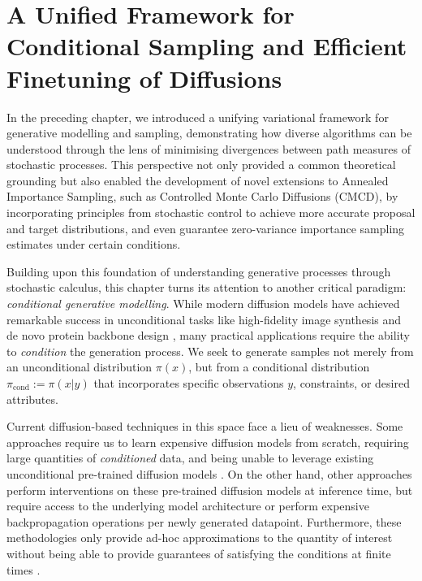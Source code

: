 \chapter[Unified Framework for Conditional Sampling and Finetuning of Diffusions]{A Unified Framework for Conditional Sampling and Efficient Finetuning of Diffusions}
\label{chapter:deft}
\ifpdf
    \graphicspath{{Chapter4/Figs/Raster/}{Chapter4/Figs/PDF/}{Chapter4/Figs/}}
\else
    \graphicspath{{Chapter4/Figs/Vector/}{Chapter4/Figs/}}
\fi

In the preceding chapter, we introduced a unifying variational framework for generative modelling and sampling, demonstrating how diverse algorithms can be understood through the lens of minimising divergences between path measures of stochastic processes. This perspective not only provided a common theoretical grounding but also enabled the development of novel extensions to Annealed Importance Sampling, such as Controlled Monte Carlo Diffusions (CMCD), by incorporating principles from stochastic control to achieve more accurate proposal and target distributions, and even guarantee zero-variance importance sampling estimates under certain conditions.

Building upon this foundation of understanding generative processes through stochastic calculus, this chapter turns its attention to another critical paradigm: \emph{conditional generative modelling}. While modern diffusion models have achieved remarkable success in unconditional tasks like high-fidelity image synthesis \citep{ho2020denoising} and de novo protein backbone design \citep{watson2023novo}, many practical applications require the ability to \emph{condition} the generation process. We seek to generate samples not merely from an unconditional distribution $\pi(x)$, but from a conditional distribution $\pi_{\text{cond}} :=\pi(x|y)$ that incorporates specific observations $y$, constraints, or desired attributes. 

Current diffusion-based techniques in this space face a lieu of weaknesses. Some approaches require us to learn expensive diffusion models from scratch, requiring large quantities of \textit{conditioned} data, and being unable to leverage existing unconditional pre-trained diffusion models \cite{ho2022classifier}. On the other hand, other approaches perform interventions on these pre-trained diffusion models at inference time, but require access to the underlying model architecture or perform expensive backpropagation operations per newly generated datapoint. Furthermore, these methodologies only provide ad-hoc approximations to the quantity of interest without being able to provide guarantees of satisfying the conditions at finite times \textcite{chung2022diffusion,finzi2023user,jalal2021robust,rout2024solving,song2022pseudoinverse,song2021solving}.

